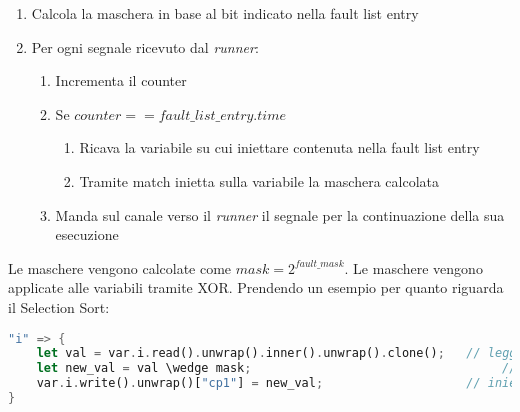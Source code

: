 \begin{enumerate}
    \item Calcola la maschera in base al bit indicato nella fault list entry
    \item Per ogni segnale ricevuto dal \textit{runner}:
    \begin{enumerate}
        \item Incrementa il counter
        \item Se $\textit{counter} == \textit{fault\_list\_entry}.\textit{time}$
        \begin{enumerate}
            \item Ricava la variabile su cui iniettare contenuta nella fault list entry
            \item Tramite match inietta sulla variabile la maschera calcolata
        \end{enumerate}
        \item Manda sul canale verso il \textit{runner} il segnale per la continuazione della sua esecuzione
    \end{enumerate}
\end{enumerate}

Le maschere vengono calcolate come $\textit{mask} = 2^{\textit{fault\_mask}}$. Le maschere vengono applicate alle variabili tramite XOR. Prendendo un esempio per quanto riguarda il Selection Sort:
\begin{lstlisting}[language=Rust, style=boxed]
"i" => {
    let val = var.i.read().unwrap().inner().unwrap().clone();   // leggo il valore della variabile
    let new_val = val \wedge mask;                                   // nuovo valore da salvare (XOR per il bitflip)
    var.i.write().unwrap()["cp1"] = new_val;                    // inietto l'errore
}
\end{lstlisting}
















